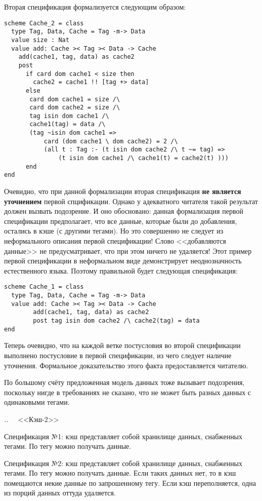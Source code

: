 \documentclass[14pt, twoside]{extreport}
\newcounter{problem_type}[chapter]
\newcounter{zadacha}[problem_type]
\newcommand{\z}{\vspace{0.5cm}\par\addtocounter{zadacha}{1}%
\textit{\arabic{chapter}.\arabic{problem_type}.\arabic{zadacha}}~~  }
\begin{document}
Вторая спецификация формализуется следующим образом:
\begin{lstlisting}
scheme Cache_2 = class
  type Tag, Data, Cache = Tag -m-> Data
  value size : Nat
  value add: Cache >< Tag >< Data -> Cache
    add(cache1, tag, data) as cache2
    post
      if card dom cache1 < size then
        cache2 = cache1 !! [tag +> data]
      else
       card dom cache1 = size /\
       card dom cache2 = size /\
       tag isin dom cache1 /\
       cache1(tag) = data /\
       (tag ~isin dom cache1 =>
           card (dom cache1 \ dom cache2) = 2 /\
           (all t : Tag :- (t isin dom cache2 /\ t ~= tag) =>
               (t isin dom cache1 /\ cache1(t) = cache2(t) )))
      end
end
\end{lstlisting}

Очевидно, что при данной формализации вторая спецификация \textbf{не является уточнением} первой спцификации. Однако у адекватного читателя такой результат должен вызвать подозрение. И оно обосновано: данная формализация первой спецификации предполагает, что все данные, которые были до добавления, остались в кэше (с другими тегами). Но это совершенно не следует из неформального описания первой спецификации! Слово <<добавляются данные>> не предусматривает, что при этом ничего не удаляется! Этот пример первой спецификации в неформальном виде демонстрирует неоднозначность естественного языка. Поэтому правильной будет следующая спецификация:
\begin{lstlisting}
scheme Cache_1 = class
  type Tag, Data, Cache = Tag -m-> Data
  value add: Cache >< Tag >< Data -> Cache
        add(cache1, tag, data) as cache2
        post tag isin dom cache2 /\ cache2(tag) = data
end
\end{lstlisting}

Теперь очевидно, что на каждой ветке постусловия во второй спецификации выполнено постусловие в первой спецификации, из чего следует наличие уточнения. Формальное доказательство этого факта предоставляется читателю.

По большому счёту предложенная модель данных тоже вызывает подозрения, поскольку нигде в требованиях не сказано, что не может быть разных данных с одинаковыми тегами.


\z <<Кэш-2>>

Спецификация №1: кэш представляет собой хранилище данных, снабженных тегами. По тегу можно получать данные.

Спецификация №2: кэш представляет собой хранилище данных, снабженных тегами. По тегу можно получать данные. Если таких данных нет, то в кэш помещаются некие данные по запрошенному тегу. Если кэш переполняется, одна из порций данных оттуда удаляется.
\end{document}
